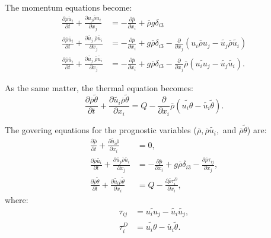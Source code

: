 The momentum equations become:
\begin{align}
  \frac{\partial \overline{\rho u_i}}{\partial t} + \frac{\partial \overline{u_j\rho u_i}}{\partial x_j} &= -\frac{\partial \overline{p}}{\partial x_i} + \overline{\rho} g\delta_{i3} \\
  \frac{\partial \overline{\rho}\widetilde{u_i}}{\partial t} + \frac{\partial \widetilde{u_j}\:\overline{\rho}\widetilde{u_i}}{\partial x_j} &= -\frac{\partial \overline{p}}{\partial x_i} + g\overline{\rho} \delta_{i3}
    -\frac{\partial}{\partial x_j}\left(\overline{u_i \rho u_j} - \widetilde{u_j}\overline{\rho}\widetilde{u_i}\right) \\
  \frac{\partial \overline{\rho}\widetilde{u_i}}{\partial t} + \frac{\partial \widetilde{u_j}\:\overline{\rho}\widetilde{u_i}}{\partial x_j} &= -\frac{\partial \overline{p}}{\partial x_i} + g\overline{\rho} \delta_{i3}
    -\frac{\partial}{\partial x_j}\overline{\rho}\left(\widetilde{u_i u_j} - \widetilde{u_j}\widetilde{u_i}\right).
\end{align}


As the same matter, the thermal equation becomes:
\begin{equation}
  \frac{\partial \overline{\rho}\widetilde{\theta}}{\partial t}
  + \frac{\partial \widetilde{u_i}\overline{\rho}\widetilde{\theta}}{\partial x_i}
  = Q -\frac{\partial}{\partial x_i}\overline{\rho}\left(\widetilde{u_i\theta}-\widetilde{u_i}\widetilde{\theta}\right).
\end{equation}

The govering equations for the prognostic variables 
($\overline{\rho}, \overline{\rho}\widetilde{u_i}, $ and $\overline{\rho}\widetilde{\theta}$) are:
\begin{align}
  \frac{\partial \overline{\rho}}{\partial t}
  + \frac{\partial \widetilde{u_i}\overline{\rho}}{\partial x_i} &= 0, \\
  \frac{\partial \overline{\rho}\widetilde{u_i}}{\partial t}
  + \frac{\partial \widetilde{u_j}\overline{\rho}\widetilde{u_i}}{\partial x_j}
  &= -\frac{\partial \overline{p}}{\partial x_i} + g\overline{\rho}\delta_{i3}
  -\frac{\partial \overline{\rho}\tau_{ij}}{\partial x_j}, \\
  \frac{\partial \overline{\rho}\widetilde{\theta}}{\partial t}
  + \frac{\partial \widetilde{u_i}\overline{\rho}\widetilde{\theta}}{\partial x_i}
  &= Q -\frac{\partial \overline{\rho}\tau^D_{i}}{\partial x_i},
\end{align}
where:
\begin{align}
  \tau_{ij} &= \widetilde{u_iu_j}-\widetilde{u_i}\widetilde{u_j}, \\
  \tau^D_{i} &= \widetilde{u_i\theta}-\widetilde{u_i}\widetilde{\theta}.
\end{align}

